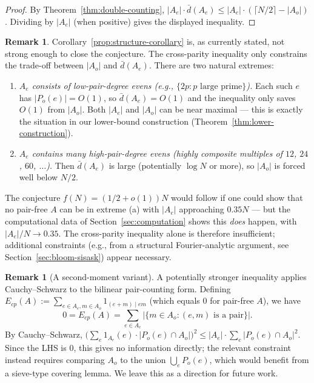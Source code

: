 \documentclass[11pt]{amsart}
\theoremstyle{plain}
\theoremstyle{definition}
\newtheorem{remark}[theorem]{Remark}
\begin{document}
\begin{proof}
By Theorem~\ref{thm:double-counting}, $|A_e| \cdot \bar{d}(A_e) \leq |A_e| \cdot (\lceil N/2 \rceil - |A_o|)$. Dividing by $|A_e|$ (when positive) gives the displayed inequality.
\end{proof}

\begin{remark}\label{rem:weakness}
Corollary~\ref{prop:structure-corollary} is, as currently stated, not strong enough to close the conjecture. The cross-parity inequality only constrains the trade-off between $|A_o|$ and $\bar{d}(A_e)$. There are two natural extremes:
\begin{enumerate}[label=(\alph*)]
  \item \emph{$A_e$ consists of low-pair-degree evens (e.g., $\{2p : p \text{ large prime}\}$).} Each such $e$ has $|P_o(e)| = O(1)$, so $\bar{d}(A_e) = O(1)$ and the inequality only saves $O(1)$ from $|A_o|$. Both $|A_e|$ and $|A_o|$ can be near maximal --- this is exactly the situation in our lower-bound construction (Theorem~\ref{thm:lower-construction}).
  \item \emph{$A_e$ contains many high-pair-degree evens (highly composite multiples of $12$, $24$, $60$, $\ldots$).} Then $\bar{d}(A_e)$ is large (potentially $\log N$ or more), so $|A_o|$ is forced well below $N/2$.
\end{enumerate}
The conjecture $f(N) = (1/2 + o(1)) N$ would follow if one could show that no pair-free $A$ can be in extreme (a) with $|A_e|$ approaching $0.35 N$ --- but the computational data of Section~\ref{sec:computation} shows this \emph{does} happen, with $|A_e| / N \to 0.35$. The cross-parity inequality alone is therefore insufficient; additional constraints (e.g., from a structural Fourier-analytic argument, see Section~\ref{sec:bloom-sisask}) appear necessary.
\end{remark}

\begin{remark}[A second-moment variant]
A potentially stronger inequality applies Cauchy--Schwarz to the bilinear pair-counting form. Defining $E_{cp}(A) := \sum_{e \in A_e, m \in A_o} 1_{(e+m) \mid em}$ (which equals $0$ for pair-free $A$), we have
\[
  0 = E_{cp}(A) = \sum_{e \in A_e} \bigl| \{m \in A_o : (e, m) \text{ is a pair}\} \bigr|.
\]
By Cauchy--Schwarz, $\bigl( \sum_e 1_{A_e}(e) \cdot |P_o(e) \cap A_o| \bigr)^2 \leq |A_e| \cdot \sum_e |P_o(e) \cap A_o|^2$. Since the LHS is $0$, this gives no information directly; the relevant constraint instead requires comparing $A_o$ to the union $\bigcup_e P_o(e)$, which would benefit from a sieve-type covering lemma. We leave this as a direction for future work.
\end{remark}
\end{document}
